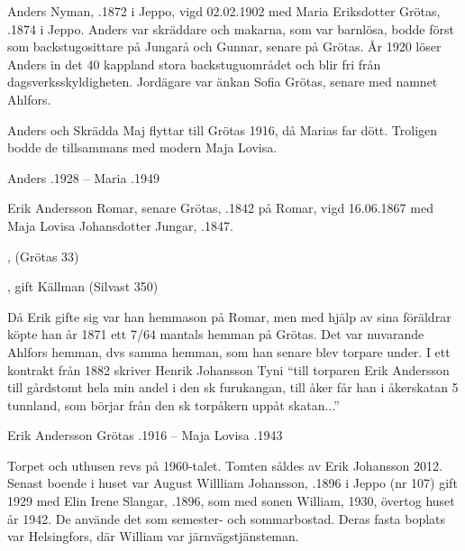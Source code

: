 Anders Nyman, .1872 i Jeppo, vigd 02.02.1902 med Maria Eriksdotter Grötas, .1874 i Jeppo. Anders var skräddare och makarna, som var barnlösa, bodde först som backstugosittare på Jungarå och Gunnar, senare på Grötas. År 1920 löser Anders in det 40 kappland stora backstuguområdet och blir fri från dagsverksskyldigheten. Jordägare var änkan Sofia Grötas, senare  med namnet Ahlfors.

Anders och Skrädda Maj flyttar till Grötas 1916, då Marias far dött. Troligen bodde de tillsammans med modern Maja Lovisa.

Anders .1928  --  Maria .1949


Erik Andersson Romar, senare Grötas, .1842 på Romar, vigd 16.06.1867 med Maja Lovisa Johansdotter Jungar, .1847.
\begin{jhchildren}
  \item {}, (Grötas 33)
  \item {}
  \item {}, gift Källman (Silvast 350)
\end{jhchildren}
Då Erik gifte sig var han hemmason på Romar, men med hjälp av sina föräldrar köpte han år 1871 ett 7/64 mantals hemman på Grötas. Det var nuvarande Ahlfors hemman, dvs samma hemman, som han senare blev torpare under. I ett kontrakt från 1882 skriver Henrik Johansson Tyni ``till torparen Erik Andersson till gårdstomt hela min andel i den sk furukangan, till åker får han i åkerskatan 5 tunnland, som börjar från den sk torpåkern uppåt skatan...''

Erik Andersson Grötas .1916  --  Maja Lovisa .1943




Torpet och uthusen revs på 1960-talet. Tomten såldes av Erik Johansson 2012. Senast boende i huset var August Willliam Johansson, .1896 i Jeppo (nr 107) gift 1929 med Elin Irene Slangar, .1896, som med sonen William,  1930, övertog huset år 1942. De använde det som semester- och sommarbostad. Deras fasta boplats var Helsingfors, där William var järnvägstjänsteman.

